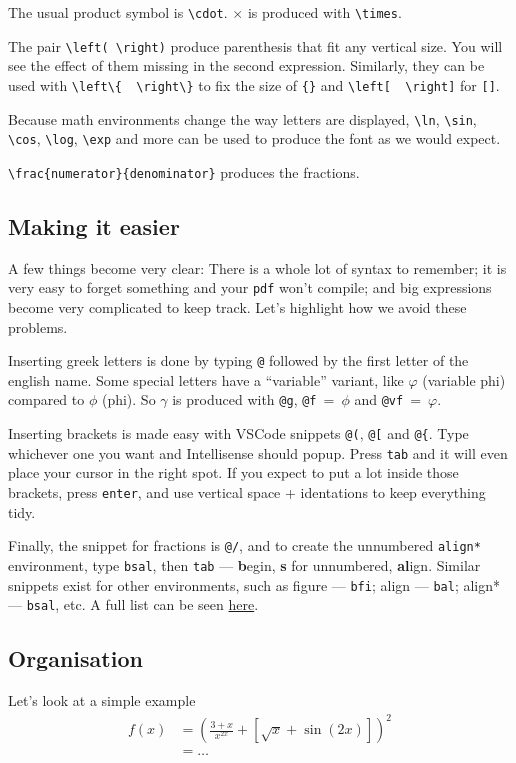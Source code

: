 The usual product symbol is \verb|\cdot|. \(\times\) is produced with \verb|\times|.

The pair \verb|\left( \right)| produce parenthesis that fit any vertical size.
You will see the effect of them missing in the second expression.
Similarly, they can be used with \verb|\left\{  \right\}| to fix the size of \verb|{}| and \verb|\left[  \right]| for \verb|[]|.

Because math environments change the way letters are displayed, \verb|\ln|, \verb|\sin|, \verb|\cos|, \verb|\log|, \verb|\exp| and more can be used to produce the font as we would expect. 

\verb|\frac{numerator}{denominator}| produces the fractions.

\subsection{Making it easier}
A few things become very clear: There is a whole lot of syntax to remember; it is very easy to forget something and your \texttt{pdf} won't compile; and big expressions become very complicated to keep track.
Let's highlight how we avoid these problems.

Inserting greek letters is done by typing \verb|@| followed by the first letter of the english name.
Some special letters have a ``variable'' variant, like \(\varphi\) (variable phi) compared to \(\phi\) (phi).
So \(\gamma\) is produced with \verb|@g|, \verb|@f|~=~\(\phi\) and \verb|@vf|~=~\(\varphi\). 

Inserting brackets is made easy with VSCode snippets \verb|@(|, \verb|@[| and \verb|@{|.
Type whichever one you want and Intellisense should popup.
Press \verb|tab| and it will even place your cursor in the right spot.
If you expect to put a lot inside those brackets, press \texttt{enter}, and use vertical space + identations to keep everything tidy.

Finally, the snippet for fractions is \verb|@/|, and to create the unnumbered \texttt{align*} environment, type \texttt{bsal}, then \texttt{tab} --- \textbf{b}egin, \textbf{s} for unnumbered, \textbf{al}ign.
Similar snippets exist for other environments, such as figure --- \texttt{bfi}; align --- \texttt{bal}; align* --- \texttt{bsal}, etc.
A full list can be seen \href{https://github.com/James-Yu/LaTeX-Workshop/wiki/Snippets}{here}.

\subsection{Organisation}
Let's look at a simple example 
\begin{align*}
    f(x) &
        = {
            \left( 
                \frac{3+x}{x^{2x}}
                + \left[ 
                    \sqrt{x} + \sin(2x)
                \right]
            \right)
        }^2
    \\
    &= \dots
\end{align*}

